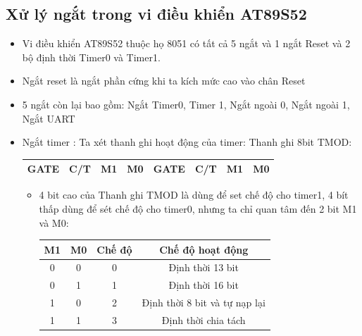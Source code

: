 \documentclass[../report.tex]{subfiles}
\begin{document}
\subsection{Xử lý ngắt trong vi điều khiển AT89S52}
\begin{itemize}
    \item Vi điều khiển AT89S52 thuộc họ 8051 có tất cả 5 ngắt và 1 ngắt Reset và 2 bộ định thời Timer0 và Timer1.
    \item Ngắt reset là ngắt phần cứng khi ta kích mức cao vào chân Reset
    \item 5 ngắt còn lại bao  gồm: Ngắt Timer0, Timer 1, Ngắt ngoài 0, Ngắt ngoài 1, Ngắt UART
    \item Ngắt timer : Ta xét thanh ghi hoạt động của timer: Thanh ghi 8bit TMOD:
        \begin{center}
                    \begin{tabular}{ |c|c|c|c|c|c|c|c| } 
                    \hline
                    GATE & C/T & M1 & M0 & GATE & C/T & M1 & M0 \\
                    \hline
                    \end{tabular}
        \end{center}
        \begin{itemize}
            \item 4 bit cao của Thanh ghi TMOD là dùng để set chế độ cho timer1, 4 bít thấp dùng để sét chế độ cho timer0, nhưng ta chỉ quan tâm đến 2 bit M1 và M0:
            \begin{center}
                    \begin{tabular}{ |c|c|c|c| } 
                    \hline
                    M1 & M0 & Chế độ & Chế độ hoạt động \\
                    \hline
                    0 & 0 & 0 & Định thời 13 bit \\
                    0 & 1 & 1 & Định thời 16 bit \\
                    1 & 0 & 2 & Định thời 8 bit và tự nạp lại \\
                    1 & 1 & 3 & Định thời chia tách \\
                    \hline
                    \end{tabular}
                    
            \end{center}


\end{itemize}
\end{itemize}
\end{document}
